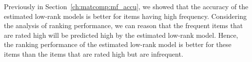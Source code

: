 Previously in Section~\ref{ch:matcomp:mf_accu}, we showed that the accuracy of the
estimated low-rank
models is better for items having high frequency.
Considering the analysis of ranking performance, we can reason that the
frequent items that are rated high will be predicted
high by the estimated low-rank model. Hence, the ranking performance of the
estimated low-rank model is 
better for these items than the items that are rated high but are infrequent. 









